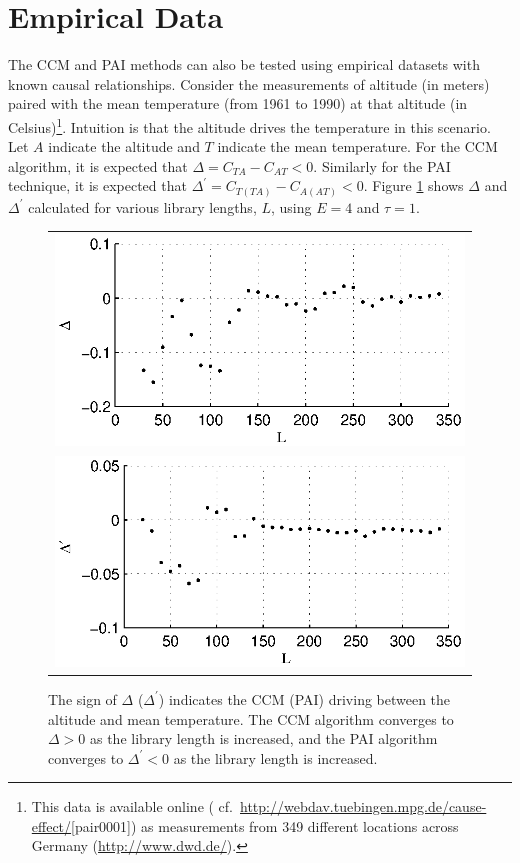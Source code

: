 \documentclass[twocolumn,aps,pre,groupedaddress]{revtex4-1}
\begin{document}
\section{Empirical Data}
The CCM and PAI methods can also be tested using empirical datasets with known causal relationships.  Consider the measurements of altitude (in meters) paired with the mean temperature (from 1961 to 1990) at that altitude (in Celsius)\footnote{This data is available online (\cite{bache2013} cf.\ \protect\url{http://webdav.tuebingen.mpg.de/cause-effect/}[pair0001]) as measurements from 349 different locations across Germany (\protect\url{http://www.dwd.de/}).}.  Intuition is that the altitude drives the temperature in this scenario.  Let $A$ indicate the altitude and $T$ indicate the mean temperature.  For the CCM algorithm, it is expected that $\Delta = C_{TA}-C_{AT} < 0$.  Similarly for the PAI technique, it is expected that $\Delta^\prime = C_{T(TA)}-C_{A(AT)} < 0$.  Figure \ref{fig:alttempdata} shows $\Delta$ and $\Delta^\prime$ calculated for various library lengths, $L$, using $E=4$ and $\tau=1$.  
\begin{figure}[ht]
\begin{tabular}{l}
\includegraphics[scale=0.8]{alttempdataCCM.eps} \\
\includegraphics[scale=0.8]{alttempdataPAI.eps} \\
\end{tabular}
\caption{The sign of $\Delta$ ($\Delta^\prime$) indicates the CCM (PAI) driving between the altitude and mean temperature. The CCM algorithm converges to $\Delta>0$ as the library length is increased, and the PAI algorithm converges to $\Delta^\prime<0$ as the library length is increased.}
\label{fig:alttempdata}
\end{figure}
\end{document}
